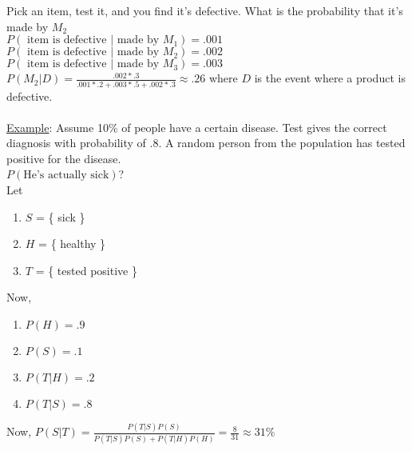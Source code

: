     Pick an item, test it, and you find it's defective. What is the probability
    that it's made by $M_2$\\
    $P(\text{ item is defective $|$ made by $M_1$}) = .001$\\
    $P(\text{ item is defective $|$ made by $M_2$}) = .002$\\
    $P(\text{ item is defective $|$ made by $M_3$}) = .003$\\
    $P(M_2 | D) = \frac{.002 * .3}{.001 * .2 + .003 * .5 + .002 * .3} \approx
      .26$ where $D$ is the event where a product is defective.\\\\
  \underline{Example}: Assume 10\% of people have a certain disease. Test gives
    the correct diagnosis with probability of .8. A random person from the
    population has tested positive for the disease.\\
    $P(\text{He's actually sick})$?\\
    Let 
    \begin{enumerate}
      \item $S$ = \{ sick \}
      \item $H$ = \{ healthy \}
      \item $T$ = \{ tested positive \}
    \end{enumerate}
    Now,
    \begin{enumerate}
      \item $P(H) = .9$
      \item $P(S) = .1$
      \item $P(T | H) = .2$
      \item $P(T | S) = .8$
    \end{enumerate}
    Now, $P(S |T) = \frac{P(T | S) P(S)}{P(T|S)P(S) + P(T|H)P(H)} = \frac{8}{31} \approx 31\%$


